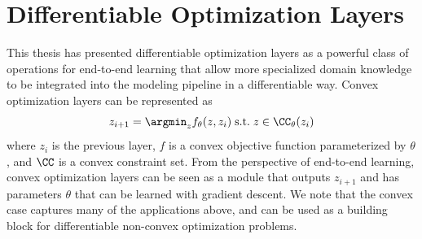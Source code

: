 \graphicspath{{cvxpyth/}}

\chapter{Differentiable \cvxpy Optimization Layers}
\label{sec:cvxpyth}

%

This thesis has presented differentiable optimization layers
as a powerful class of operations for end-to-end learning
that allow more specialized domain knowledge to be integrated
into the modeling pipeline in a differentiable way.
Convex optimization layers can be represented as
\begin{equation}
  \label{eq:optimization-layer}
  z_{i+1} = \argmin_z f_\theta(z, z_i)\;
  {\rm s.t.}\;z\in \CC_\theta(z_i)
\end{equation}
where $z_i$ is the previous layer,
$f$ is a convex objective function parameterized
by $\theta$, and $\CC$ is a convex constraint set.
From the perspective of end-to-end learning,
convex optimization layers can be seen
as a module that outputs $z_{i+1}$ and has parameters
$\theta$ that can be learned with gradient descent.
We note that the convex case captures many
of the applications above, and can be used as
a building block for differentiable non-convex
optimization problems.

